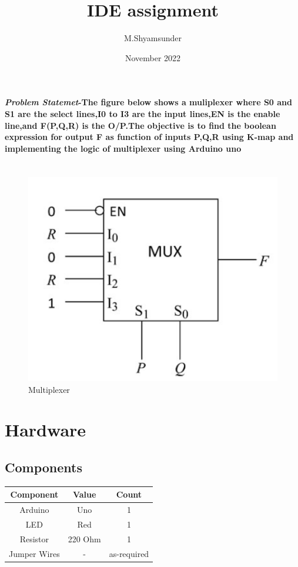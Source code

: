 \documentclass[journal,10pt,twocolumn]{article}
\title{\textbf{IDE assignment}}
\author{M.Shyamsunder}
\date{November 2022}
\begin{document}
\maketitle
\paragraph{\textit{Problem Statemet}-The figure below shows a muliplexer where S0 and S1 are the select lines,I0 to I3 are the input lines,EN is the enable line,and F(P,Q,R) is the O/P.The objective is to find the boolean expression for output F as function of inputs P,Q,R using K-map and implementing the logic of multiplexer using Arduino uno}

\section*{\normalsize}
\begin{figure}[ht]
\centering
\includegraphics[width=1\columnwidth]{mux.png}
\caption{Multiplexer}
\label{fig:mux}
\end{figure}


\section*{\large Hardware}
\subsection*{\normalsize Components}
{
\centering
\begin{tabular}{|c|c|c|}
\hline
Component&Value&Count\\
\hline
Arduino&Uno&1\\
\hline
LED&Red&1\\
\hline
Resistor&220 Ohm&1\\
\hline
Jumper Wires&-&as-required\\
\hline
\end{tabular}\par
}
\end{document}
